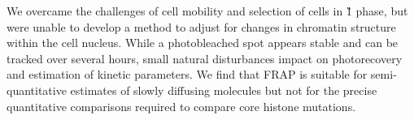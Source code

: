     We overcame the challenges of cell mobility
    and selection of cells in \G1{} phase,
    but were unable to develop a method to adjust
    for changes in chromatin structure within the cell nucleus.
    While a photobleached spot appears stable and
    can be tracked over several hours,
    small natural disturbances impact on photorecovery
    and estimation of kinetic parameters.
    We find that FRAP is suitable for semi-quantitative
    estimates of slowly diffusing molecules
    but not for the precise quantitative comparisons
    required to compare core histone mutations.


